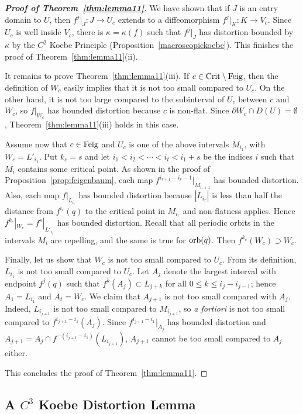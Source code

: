 \documentclass[12pt, psamsfonts, reqno]{amsart}
\begin{document}
\begin{proof}[\textbf{Proof of Theorem~\ref{thm:lemma11}}]
We have shown that if $J$ is an entry domain to $U$, then
$f^j|_J:J\to U_c$ extends to a diffeomorphism  $f^j|_K:K\to V_c$.
Since $U_c$ is well inside $V_c$, there is $\kappa=\kappa(f)$ such
that $f^j|_J$ has distortion bounded by $\kappa$ by the $C^2$
Koebe Principle (Proposition~\ref{macroscopickoebe}).
This finishes the proof of
Theorem~\ref{thm:lemma11}(ii).

It remains to prove Theorem~\ref{thm:lemma11}(iii). If $c\in
{\mathop{\rm Crit}\nolimits}\setminus {\mathop{\rm Feig}\nolimits}$, then the definition of $W_c$ easily implies
that it is not too small compared to $U_c$. On the other hand, it
is not too large compared to the subinterval of $U_c$ between $c$
and $W_c$, so $f|_{W_c}$ has bounded distortion because $c$ is
non-flat. Since $\partial W_c\cap D(U)=\emptyset$,
Theorem~\ref{thm:lemma11}(iii) holds in this case.

Assume now that $c\in {\mathop{\rm Feig}\nolimits}$ and $U_c$ is one of the above
intervals $M_{i_1}$, with $W_c=L'_{i_1}$. Put $k_c=s$ and let
$i_1<i_2<\cdots <i_t < i_1+s$ be the indices $i$ such that
$M_i$ contains some critical point. As shown in the proof of
Proposition~\ref{prop:feigenbaum}, each map
$f^{i_{r+1}-i_r-1}|_{M_{i_r+1}}$ has bounded distortion. Also,
each map $f|_{L_{i_r}}$ has bounded distortion because $|L_{i_r}|$
is less than half the distance from $f^{i_r}(q)$ to the critical
point in $M_{i_r}$ and non-flatness applies. Hence
$f^{k_c}|_{W_c}=f^s|_{L'_{i_1}}$ has bounded distortion. Recall
that all periodic orbits in the intervals $M_i$ are repelling, and
the same is true for ${\mathop{\rm orb}\nolimits}(q)$. Then $f^{k_c}(W_c)\supset W_c$.

Finally, let us show that $W_c$ is not too small compared to
$U_c$. From its definition, $L_{i_1}$ is not too small compared to
$U_c$.
Let $A_j$ denote the largest interval with endpoint $f^j(q)$
such that $f^k(A_j) \subset L_{j+k}$ for all $0 \leq k \leq i_j-i_{j-1}$;
hence $A_1=L_{i_1}$ and $A_t=W_c$.
We claim that $A_{j+1}$ is not too small
compared with $A_j$. Indeed, $L_{i_{j+1}}$ is not
too small compared to $M_{i_{j+1}}$, so \emph{a fortiori} is not
too small compared to $f^{i_{j+1}-i_1}(A_j)$. Since
$f^{i_{j+1}-i_1}|_{A_j}$ has bounded distortion and
$A_{j+1}=A_j\cap f^{-(i_{j+1}-i_1)}(L_{i_{j+1}})$, $A_{j+1}$
cannot be too small compared to $A_j$ either.

This concludes the proof of Theorem~\ref{thm:lemma11}.
\end{proof}

\subsection{A \boldmath $C^3$ \unboldmath Koebe Distortion Lemma}
\end{document}
